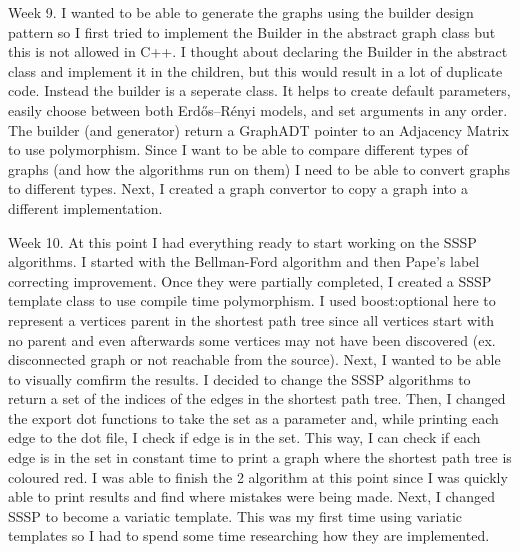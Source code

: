 \documentclass{article}
\begin{document}
Week 9. 
I wanted to be able to generate the graphs using the builder design pattern so I first tried to implement the Builder in the abstract graph class but this is not allowed in C++. I thought about declaring the Builder in the abstract class and implement it in the children, but this would result in a lot of duplicate code. Instead the builder is a seperate class. It helps to create default parameters, easily choose between both Erdős–Rényi models, and set arguments in any order. The builder (and generator) return a GraphADT pointer to an Adjacency Matrix to use polymorphism. Since I want to be able to compare different types of graphs (and how the algorithms run on them) I need to be able to convert graphs to different types. Next, I created a graph convertor to copy a graph into a different implementation.

Week 10. 
At this point I had everything ready to start working on the SSSP algorithms. I started with the Bellman-Ford algorithm and then Pape's label correcting improvement. Once they were partially completed, I created a SSSP template class to use compile time polymorphism. I used boost:optional here to represent a vertices parent in the shortest path tree since all vertices start with no parent and even afterwards some vertices may not have been discovered (ex. disconnected graph or not reachable from the source). Next, I wanted to be able to visually comfirm the results. I decided to change the SSSP algorithms to return a set of the indices of the edges in the shortest path tree. Then, I changed the export dot functions to take the set as a parameter and, while printing each edge to the dot file, I check if edge is in the set. This way, I can check if each edge is in the set in constant time to print a graph where the shortest path tree is coloured red. I was able to finish the 2 algorithm at this point since I was quickly able to print results and find where mistakes were being made. Next, I changed SSSP to become a variatic template. This was my first time using variatic templates so I had to spend some time researching how they are implemented.
\end{document}
